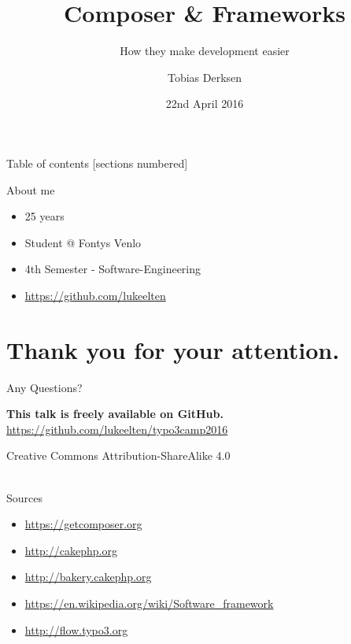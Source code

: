 \documentclass{beamer}
\title{Composer \& Frameworks}
\subtitle{How they make development easier}
\date{22nd April 2016}
\author{Tobias Derksen}
\institute{Fontys School of Technology \& Logistics}
\begin{document}
  \maketitle

  \begin{frame}{Table of contents}
    [sections numbered]
    \tableofcontents[hideallsubsections]
  \end{frame}


  \begin{frame}{About me}
  	\begin{itemize}
  		\item 25 years
  		\item Student @ Fontys Venlo
  		\item 4th Semester - Software-Engineering
  		\item \url{https://github.com/lukeelten}
  	\end{itemize}
  \end{frame}

  
  

	\section*{Thank you for your attention.}
	\begin{frame}[standout]
		Any Questions?
	\end{frame}
	
	\appendix
	
	\begin{frame}{}
		\textbf{This talk is freely available on GitHub.} \\
		\url{https://github.com/lukeelten/typo3camp2016}
		\vfill
		\begin{center}
			Creative Commons Attribution-ShareAlike 4.0 ~\\~\\
			\ccbysa
		\end{center}
	\end{frame}
	
	\begin{frame}{Sources}
		\begin{itemize}
			\item \url{https://getcomposer.org}
			\item \url{http://cakephp.org}
			\item \url{http://bakery.cakephp.org}
			\item \url{https://en.wikipedia.org/wiki/Software_framework}
			\item \url{http://flow.typo3.org}
		\end{itemize}
	\end{frame}
\end{document}
